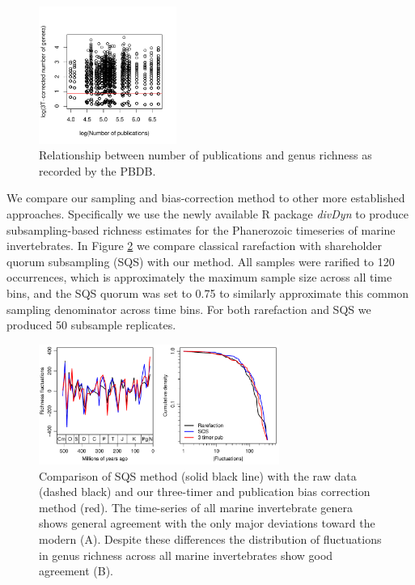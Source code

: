\documentclass[12pt]{article}
\let\citep=\cite
\begin{document}
\begin{figure}[!hp]
  \centering
  \includegraphics[width=0.4\textwidth]{../../figSupp_divByPub.pdf}
  \caption[Relationship between number of publications and genus
  richness]{Relationship between number of publications and genus
    richness as recorded by the PBDB.}
  \label{figSupp:divByPub}
\end{figure}


We compare our sampling and bias-correction method to other more
established approaches. Specifically we use the newly available R
package {\it divDyn} \citep{kocsis2018} to produce subsampling-based
richness estimates for the Phanerozoic timeseries of marine
invertebrates. In Figure \ref{figSupp:3TPub} we compare classical
rarefaction with shareholder quorum subsampling (SQS) with our
method. All samples were rarified to 120 occurrences, which is
approximately the maximum sample size across all time bins, and the
SQS quorum was set to 0.75 to similarly approximate this common
sampling denominator across time bins. For both rarefaction and SQS we
produced 50 subsample replicates.

  
\begin{figure}[!hp]
  \centering
  \includegraphics[width=0.7\textwidth]{../../figSupp_divEstComp.pdf}
  \caption[Comparison of SQS method with the raw data and three-timer
  bias correction method]{Comparison of SQS method \citep{alroy2010}
    (solid black line) with the raw data (dashed black) and our
    three-timer and publication bias correction method (red). The
    time-series of all marine invertebrate genera shows general
    agreement with the only major deviations toward the modern
    (A). Despite these differences the distribution of fluctuations in
    genus richness across all marine invertebrates show good
    agreement (B).}
  \label{figSupp:3TPub}
\end{figure}
\end{document}
